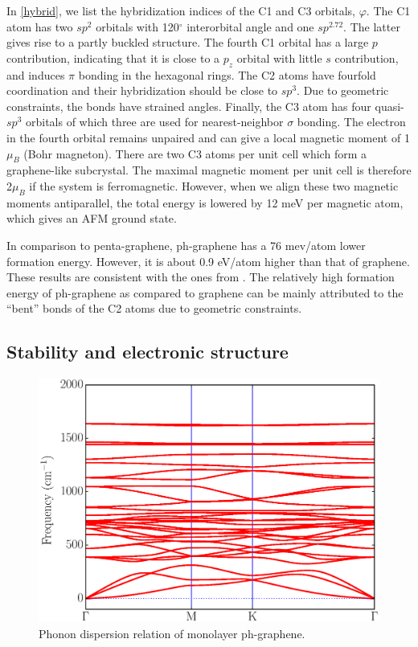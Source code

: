 In \autoref{hybrid}, we list the hybridization indices of the C1 and C3 orbitals, $\varphi$.  The C1 atom has two $sp^2$ orbitals with 120$^{\circ}$ interorbital angle and one $sp^{2.72}$. The latter gives rise to a partly buckled structure. The fourth C1 orbital has a large $p$ contribution, indicating that it is close to a $p_z$ orbital with little $s$ contribution, and induces $\pi$ bonding in the hexagonal rings. The C2 atoms have fourfold coordination and their hybridization should be close to $sp^3$. Due to geometric constraints, the bonds have strained angles\cite{coulson1949}. Finally, the C3 atom has four quasi-$sp^3$ orbitals of which three are used for nearest-neighbor $\sigma$ bonding. The electron in the fourth orbital remains unpaired and can give a local magnetic moment of 1 $\mu_B$ (Bohr magneton). There are two C3 atoms per unit cell which form a graphene-like subcrystal. The maximal magnetic moment per unit cell is therefore  2$\mu_B$ if the system is ferromagnetic. However, when we align these two magnetic moments antiparallel, the total energy is lowered by 12 meV per magnetic atom, which gives an AFM ground state. 

In comparison to penta-graphene, ph-graphene has a 76 mev/atom lower formation energy. However, it is about 0.9 eV/atom higher than that of graphene. These results are consistent with the ones from \citet{Zhang2016}. The relatively high formation energy of ph-graphene as compared to graphene can be mainly attributed to the ``bent'' bonds of the C2 atoms due to geometric constraints. 

\subsection{Stability and electronic structure}

\begin{figure}[htbp]
\centering
\includegraphics[width=0.7\linewidth]{PG_phonon.eps}%
\caption{Phonon dispersion relation of monolayer ph-graphene. \label{phonon}}
\end{figure}

